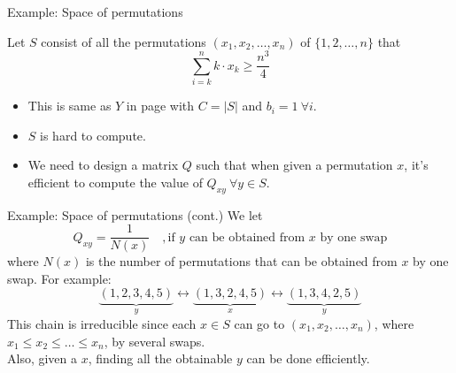 \documentclass[mathserif]{beamer}
\begin{document}
\begin{frame}{Example: Space of permutations}
\begin{example}
Let $S$ consist of all the permutations $(x_1, x_2, \ldots, x_n)$ of $\{1,2,\ldots,n\}$ that
\[
\sum_{i=k}^n k\cdot x_k \geq \frac{n^3}{4}
\]
\end{example}
\begin{itemize}
\item This is same as $Y$ in page \pageref{possible_Y} with $C=|S|$ and $b_i = 1 ~\forall i$.
\item $S$ is hard to compute.
\item We need to design a matrix $Q$ such that when given a permutation $x$, it's efficient to compute the value of $Q_{xy} ~\forall y\in S$.
\end{itemize}
\end{frame}

\begin{frame}{Example: Space of permutations (cont.)}
We let
\[
Q_{xy} = \frac{1}{N(x)} \quad,\text{if $y$ can be obtained from $x$ by one swap}
\]
where $N(x)$ is the number of permutations that can be obtained from $x$ by one swap.
For example:
\[
\underbrace{(1,2,3,4,5)}_y \leftrightarrow 
\underbrace{(1,3,2,4,5)}_x \leftrightarrow 
\underbrace{(1,3,4,2,5)}_y
\]
This chain is irreducible since each $x\in S$ can go to $(x_1,x_2,\ldots,x_n)$, where $x_1 \leq x_2 \leq \ldots \leq x_n$, by several swaps.\\
Also, given a $x$, finding all the obtainable $y$ can be done efficiently.
\end{frame}
\end{document}
